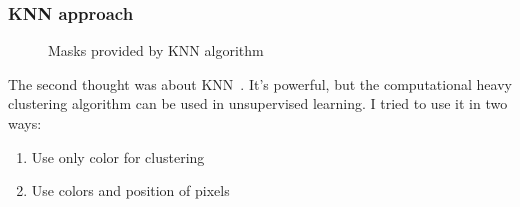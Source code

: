 \subsubsection{KNN approach}
\begin{figure}[h]
    \begin{center}
    \end{center}
    \caption{Masks provided by KNN algorithm}
\end{figure}
The second thought was about KNN~\cite{knn}. It's powerful, but the computational heavy clustering algorithm can be used in unsupervised learning. 
I tried to use it in two ways:
\begin{enumerate}
    \item Use only color for clustering
    \item Use colors and position of pixels
\end{enumerate}

